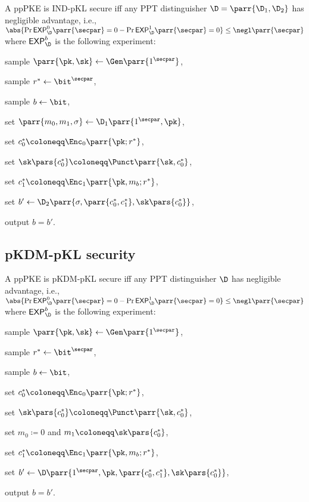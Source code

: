 \begin{definition}
    A ppPKE is IND-pKL secure iff any PPT distinguisher \(\D = \parr{\D_1,\D_2}\) has negligible advantage, i.e., \(\abs{\Pr{\textsf{EXP}^0_\D\parr{\secpar} = 0} - \Pr{\textsf{EXP}^1_\D\parr{\secpar} = 0}} \leq \negl\parr{\secpar}\) where \(\textsf{EXP}^b_\D\) is the following experiment:
    \begin{sitemize}
        \item sample \(\parr{\pk,\sk} \gets \Gen\parr{1^\secpar}\),
        \item sample \(r^* \gets \bit^\secpar\),
        \item sample \(b \gets \bit\),
        \item set \(\parr{m_0,m_1,\sigma} \gets \D_1\parr{1^\secpar,\pk}\),
        \item set \(c_0^* \coloneqq \Enc_0\parr{\pk;r^*}\),
        \item set \(\sk\pars{c^*_0} \coloneqq \Punct\parr{\sk,c_0^*}\),
        \item set \(c_1^* \coloneqq \Enc_1\parr{\pk,m_b;r^*}\),
        \item set \(b' \gets \D_2\parr{\sigma,\parr{c^*_0,c^*_1},\sk\pars{c^*_0}}\),
        \item output \(b = b'\).
    \end{sitemize}
\end{definition}


\subsection{pKDM-pKL security}

\begin{definition}
    A ppPKE is pKDM-pKL secure iff any PPT distinguisher \(\D\) has negligible advantage, i.e., \(\abs{\Pr{\textsf{EXP}^0_\D\parr{\secpar} = 0} - \Pr{\textsf{EXP}^1_\D\parr{\secpar} = 0}} \leq \negl\parr{\secpar}\) where \(\textsf{EXP}^b_\D\) is the following experiment:
    \begin{sitemize}
        \item sample \(\parr{\pk,\sk} \gets \Gen\parr{1^\secpar}\),
        \item sample \(r^* \gets \bit^\secpar\),
        \item sample \(b \gets \bit\),
        \item set \(c_0^* \coloneqq \Enc_0\parr{\pk;r^*}\),
        \item set \(\sk\pars{c^*_0} \coloneqq \Punct\parr{\sk,c_0^*}\),
        \item set \(m_0 \coloneqq 0\) and \(m_1 \coloneqq \sk\pars{c^*_0}\),
        \item set \(c_1^* \coloneqq \Enc_1\parr{\pk,m_b;r^*}\),
        \item set \(b' \gets \D\parr{1^\secpar,\pk,\parr{c^*_0,c^*_1},\sk\pars{c^*_0}}\),
        \item output \(b = b'\).
    \end{sitemize}
\end{definition}

